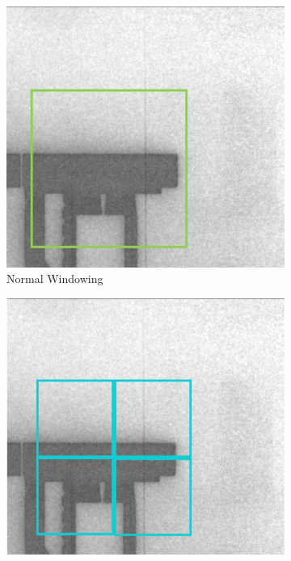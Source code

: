  \begin{figure}[!h]
 \centering
 \begin{subfigure}{0.33\textwidth}
   \centering
   \includegraphics[width=\linewidth]{images/implementation/windowing/normal_window}
   \caption{Normal Windowing}
 \end{subfigure}%
 \begin{subfigure}{0.33\textwidth}
   \centering
   \includegraphics[width=\linewidth]{images/implementation/windowing/double_window}

\end{subfigure}
\end{figure}
